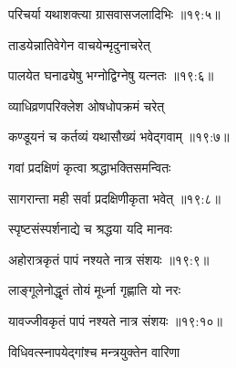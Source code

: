 
{\devanagarifont परिचर्या यथाशक्त्या ग्रासवासजलादिभिः {॥१९:५॥} \veg\dontdisplaylinenum }%
 
{\devanagarifont ताडयेन्नातिवेगेन वाचयेन्मृदुनाचरेत् \thinspace{\dandab} \dontdisplaylinenum }%
 

{\devanagarifont पालयेत घनाढ्येषु भग्नोद्विग्नेषु यत्नतः {॥१९:६॥} \veg\dontdisplaylinenum }%

{\devanagarifont व्याधिव्रणपरिक्लेश ओषधोपक्रमं चरेत् \thinspace{\dandab} \dontdisplaylinenum }%


{\devanagarifont कण्डूयनं च कर्तव्यं यथासौख्यं भवेद्गवाम् {॥१९:७॥} \veg\dontdisplaylinenum }%
 
{\devanagarifont गवां प्रदक्षिणं कृत्वा श्रद्धाभक्तिसमन्वितः \thinspace{\dandab} \dontdisplaylinenum }%


{\devanagarifont सागरान्ता मही सर्वा प्रदक्षिणीकृता भवेत् {॥१९:८॥} \veg\dontdisplaylinenum }%

{\devanagarifont स्पृष्टसंस्पर्शनाद्ये च श्रद्धया यदि मानवः \thinspace{\dandab} \dontdisplaylinenum }%


{\devanagarifont अहोरात्रकृतं पापं नश्यते नात्र संशयः {॥१९:९॥} \veg\dontdisplaylinenum }%
 
{\devanagarifont लाङ्गूलेनोद्धृतं तोयं मूर्ध्ना गृह्णाति यो नरः \thinspace{\dandab} \dontdisplaylinenum }%
 

{\devanagarifont यावज्जीवकृतं पापं नश्यते नात्र संशयः {॥१९:१०॥} \veg\dontdisplaylinenum }%
 
{\devanagarifont विधिवत्स्नापयेद्गांश्च मन्त्रयुक्तेन वारिणा \thinspace{\dandab} \dontdisplaylinenum }%

